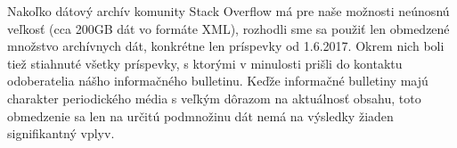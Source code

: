 Nakoľko dátový archív komunity Stack Overflow má pre naše možnosti neúnosnú veľkosť (cca 200GB dát vo formáte XML),
rozhodli sme sa použiť len obmedzené množstvo archívnych dát, konkrétne len príspevky od 1.6.2017.
Okrem nich boli tiež stiahnuté všetky príspevky, s ktorými v minulosti prišli do kontaktu odoberatelia nášho informačného
bulletinu. Keďže informačné bulletiny majú charakter periodického média s veľkým dôrazom na aktuálnosť obsahu, toto
obmedzenie sa len na určitú podmnožinu dát nemá na výsledky žiaden signifikantný vplyv.
